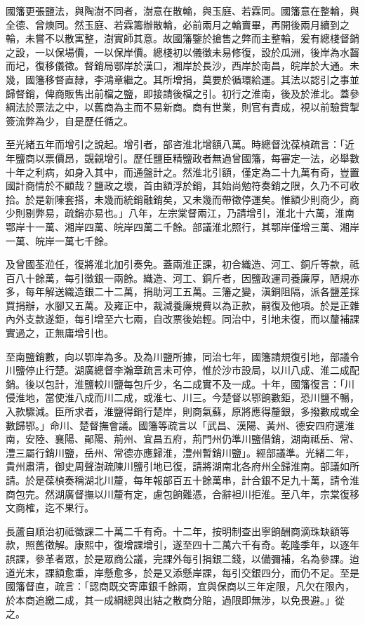 \begin{pinyinscope}
國籓更張鹽法，與陶澍不同者，澍意在散輪，與玉庭、若霖同。國籓意在整輪，與全德、曾燠同。然玉庭、若霖籌辦散輪，必前兩月之輪賣畢，再開後兩月續到之輪，未嘗不以散寓整，澍實師其意。故國籓鑒於搶售之弊而主整輪，爰有總棧督銷之設，一以保場價，一以保岸價。總棧初以儀徵未易修復，設於瓜洲，後岸為水齧而圮，復移儀徵。督銷局鄂岸於漢口，湘岸於長沙，西岸於南昌，皖岸於大通。未幾，國籓移督直隸，李鴻章繼之。其所增捐，莫要於循環給運。其法以認引之事並歸督銷，俾商販售出前檔之鹽，即接請後檔之引。初行之淮南，後及於淮北。蓋參綱法於票法之中，以舊商為主而不易新商。商有世業，則官有責成，視以前驗貲掣簽流弊為少，自是歷任循之。

至光緒五年而增引之說起。增引者，部咨淮北增額八萬。時總督沈葆楨疏言：「近年鹽商以票價昂，覬覦增引。歷任鹽臣精鹽政者無過曾國籓，每審定一法，必舉數十年之利病，如身入其中，而通盤計之。然淮北引額，僅定為二十九萬有奇，豈置國計商情於不顧哉？鹽政之壞，首由額浮於銷，其始尚勉符奏銷之限，久乃不可收拾。於是新陳套搭，未幾而統銷融銷矣，又未幾而帶徵停運矣。惟額少則商少，商少則剔弊易，疏銷亦易也。」八年，左宗棠督兩江，乃請增引，淮北十六萬，淮南鄂岸十一萬、湘岸四萬、皖岸四萬二千餘。部議淮北照行，其鄂岸僅增三萬、湘岸一萬、皖岸一萬七千餘。

及曾國荃涖任，復將淮北加引奏免。蓋兩淮正課，初合織造、河工、銅斤等款，祗百八十餘萬，每引徵銀一兩餘。織造、河工、銅斤者，因鹽政運司養廉厚，陋規亦多，每年解送織造銀二十二萬，捐助河工五萬。三籓之變，滇銅阻隔，派各鹽差採買捐辦，水腳又五萬。及雍正中，裁減養廉規費以為正款，嗣復及他項。於是正雜內外支款遂鉅，每引增至六七兩，自改票後始輕。同治中，引地未復，而以釐補課實過之，正無庸增引也。

至南鹽銷數，向以鄂岸為多。及為川鹽所據，同治七年，國籓請規復引地，部議令川鹽停止行楚。湖廣總督李瀚章疏言未可停，惟於沙市設局，以川八成、淮二成配銷。後以包計，淮鹽較川鹽每包斤少，名二成實不及一成。十年，國籓復言：「川侵淮地，當使淮八成而川二成，或淮七、川三。今楚督以鄂餉數鉅，恐川鹽不暢，入款驟減。臣所求者，淮鹽得銷行楚岸，則商氣蘇，原將應得釐銀，多撥數成或全數歸鄂。」命川、楚督撫會議。國籓等疏言以「武昌、漢陽、黃州、德安四府還淮南，安陸、襄陽、鄖陽、荊州、宜昌五府，荊門州仍準川鹽借銷，湖南祗岳、常、澧三屬行銷川鹽，岳州、常德亦應歸淮，澧州暫銷川鹽」。經部議準。光緒二年，貴州肅清，御史周聲澍疏陳川鹽引地已復，請將湖南北各府州全歸淮南。部議如所請。於是葆楨奏稱湖北川釐，每年報部百五十餘萬串，計合銀不足九十萬，請令淮商包完。然湖廣督撫以川釐有定，慮包餉難憑，合辭袒川拒淮。至八年，宗棠復移文商榷，迄不果行。

長蘆自順治初祗徵課二十萬二千有奇。十二年，按明制查出寧餉酬商滴珠缺額等款，照舊徵解。康熙中，復增課增引，遂至四十二萬六千有奇。乾隆季年，以逐年誤課，參革者眾，於是眾商公議，完課外每引捐銀二錢，以備彌補，名為參課。迨道光末，課額愈重，岸懸愈多，於是又添懸岸課，每引交銀四分，而仍不足。至是國籓督直，疏言：「認商既交寄庫銀千餘兩，宜與保商以三年定限，凡欠在限內，於本商追繳二成，其一成綱總與出結之散商分賠，過限即無涉，以免畏避。」從之。


\end{pinyinscope}
